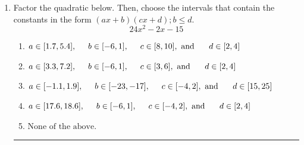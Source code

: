 \documentclass[14pt]{extbook}
\newcommand{\litem}[1]{\item#1\hspace*{-1cm}\rule{\textwidth}{0.4pt}}
\begin{document}
\begin{enumerate}
\litem{
Factor the quadratic below. Then, choose the intervals that contain the constants in the form $(ax+b)(cx+d); b \leq d.$\[ 24x^{2} -2 x -15 \]\begin{enumerate}[label=\Alph*.]
\item \( a \in [1.7, 5.4], \hspace*{5mm} b \in [-6, 1], \hspace*{5mm} c \in [8, 10], \text{ and } \hspace*{5mm} d \in [2, 4] \)
\item \( a \in [3.3, 7.2], \hspace*{5mm} b \in [-6, 1], \hspace*{5mm} c \in [3, 6], \text{ and } \hspace*{5mm} d \in [2, 4] \)
\item \( a \in [-1.1, 1.9], \hspace*{5mm} b \in [-23, -17], \hspace*{5mm} c \in [-4, 2], \text{ and } \hspace*{5mm} d \in [15, 25] \)
\item \( a \in [17.6, 18.6], \hspace*{5mm} b \in [-6, 1], \hspace*{5mm} c \in [-4, 2], \text{ and } \hspace*{5mm} d \in [2, 4] \)
\item \( \text{None of the above.} \)


\end{enumerate}}
\end{enumerate}
\end{document}
